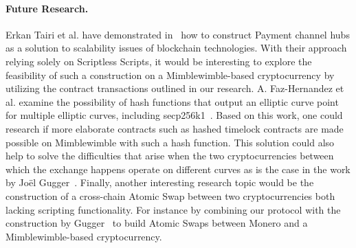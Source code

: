 \paragraph{Future Research.} Erkan Tairi et al. have demonstrated in~\cite{tairi2019a2l} how to construct Payment channel hubs as a solution to scalability issues of blockchain technologies.
With their approach relying solely on Scriptless Scripts, it would be interesting to explore the feasibility of such a construction on a Mimblewimble-based cryptocurrency by utilizing the contract transactions outlined in our research.
A. Faz-Hernandez et al. examine the possibility of hash functions that output an elliptic curve point for multiple elliptic curves, including secp256k1~\cite{hernandez2020hashing}.
Based on this work, one could research if more elaborate contracts such as hashed timelock contracts are made possible on Mimblewimble with such a hash function.
This solution could also help to solve the difficulties that arise when the two cryptocurrencies between which the exchange happens operate on different curves as is the case in the work by Joël Gugger~\cite{gugger2020bitcoin}.
Finally, another interesting research topic would be the construction of a cross-chain Atomic Swap between two cryptocurrencies both lacking scripting functionality.
For instance by combining our protocol with the construction by Gugger~\cite{gugger2020bitcoin} to build Atomic Swaps between Monero and a Mimblewimble-based cryptocurrency.